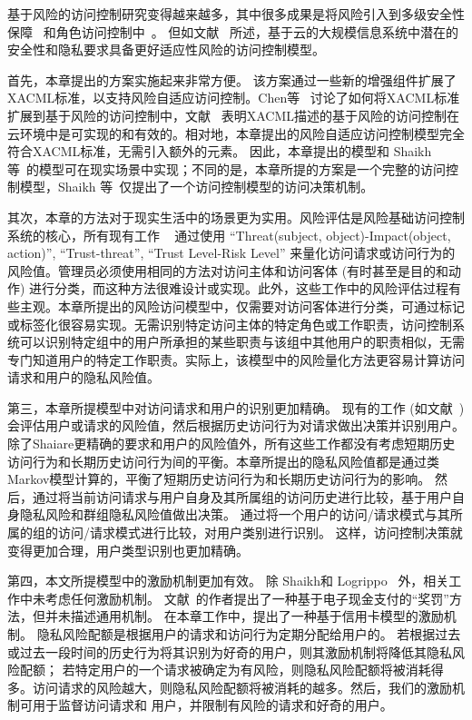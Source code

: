 基于风险的访问控制研究变得越来越多，其中很多成果是将风险引入到多级安全性保障~\cite{cheng2007fuzzy,ni2010risk} 和角色访问控制中~\cite{chen2011risk,choi2015framework}。 但如文献~\cite{wang2011quantified,shaikh2012dynamic,khambhammettu2013framework} 所述，基于云的大规模信息系统中潜在的安全性和隐私要求具备更好适应性风险的访问控制模型。

首先，本章提出的方案实施起来非常方便。 该方案通过一些新的增强组件扩展了XACML标准，以支持风险自适应访问控制。Chen等~\cite{chen2013xacml} 讨论了如何将XACML标准扩展到基于风险的访问控制中，文献~\cite{santos2014dynamic} 表明XACML描述的基于风险的访问控制在云环境中是可实现的和有效的。相对地，本章提出的风险自适应访问控制模型完全符合XACML标准，无需引入额外的元素。 因此，本章提出的模型和 Shaikh 等~\cite{shaikh2012dynamic}的模型可在现实场景中实现；不同的是，本章所提的方案是一个完整的访问控制模型，Shaikh 等~\cite{shaikh2012dynamic}仅提出了一个访问控制模型的访问决策机制。

其次，本章的方法对于现实生活中的场景更为实用。风险评估是风险基础访问控制系统的核心，所有现有工作 ~\cite{wang2011quantified, shaikh2012dynamic, khambhammettu2013framework} 通过使用 “Threat(subject, object)-Impact(object, action)”, “Trust-threat”, “Trust Level-Risk Level” 来量化访问请求或访问行为的风险值。管理员必须使用相同的方法对访问主体和访问客体 (有时甚至是目的和动作) 进行分类，而这种方法很难设计或实现。此外，这些工作中的风险评估过程有些主观。本章所提出的风险访问模型中，仅需要对访问客体进行分类，可通过标记或标签化很容易实现。无需识别特定访问主体的特定角色或工作职责，访问控制系统可以识别特定组中的用户所承担的某些职责与该组中其他用户的职责相似，无需专门知道用户的特定工作职责。实际上，该模型中的风险量化方法更容易计算访问请求和用户的隐私风险值。

第三，本章所提模型中对访问请求和用户的识别更加精确。 现有的工作 (如文献~\cite{wang2011quantified,shaikh2012dynamic}) 会评估用户或请求的风险值，然后根据历史访问行为对请求做出决策并识别用户。 除了Shaiare更精确的要求和用户的风险值外，所有这些工作都没有考虑短期历史访问行为和长期历史访问行为间的平衡。本章所提出的隐私风险值都是通过类Markov模型计算的，平衡了短期历史访问行为和长期历史访问行为的影响。 然后，通过将当前访问请求与用户自身及其所属组的访问历史进行比较，基于用户自身隐私风险和群组隐私风险值做出决策。 通过将一个用户的访问/请求模式与其所属的组的访问/请求模式进行比较，对用户类别进行识别。 这样，访问控制决策就变得更加合理，用户类型识别也更加精确。

第四，本文所提模型中的激励机制更加有效。 除 Shaikh和 Logrippo ~\cite{shaikh2012dynamic}外，相关工作中未考虑任何激励机制。 文献~\cite{shaikh2012dynamic}的作者提出了一种基于电子现金支付的“奖罚”方法，但并未描述通用机制。 在本章工作中，提出了一种基于信用卡模型的激励机制。 隐私风险配额是根据用户的请求和访问行为定期分配给用户的。 若根据过去或过去一段时间的历史行为将其识别为好奇的用户，则其激励机制将降低其隐私风险配额； 若特定用户的一个请求被确定为有风险，则隐私风险配额将被消耗得多。访问请求的风险越大，则隐私风险配额将被消耗的越多。然后，我们的激励机制可用于监督访问请求和 用户，并限制有风险的请求和好奇的用户。

